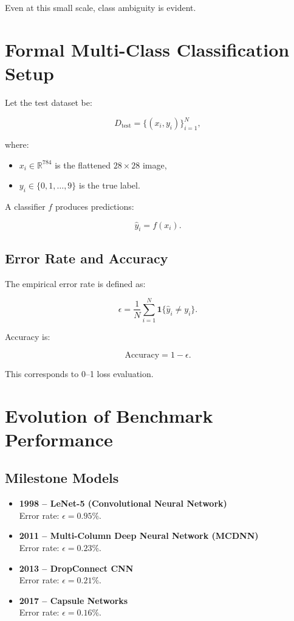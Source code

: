 \documentclass[11pt]{article}
\begin{document}
Even at this small scale, class ambiguity is evident.

\section{Formal Multi-Class Classification Setup}

Let the test dataset be:

\[
D_{\text{test}} = \{(x_i, y_i)\}_{i=1}^N,
\]

where:
\begin{itemize}
    \item $x_i \in \mathbb{R}^{784}$ is the flattened $28\times 28$ image,
    \item $y_i \in \{0,1,\dots,9\}$ is the true label.
\end{itemize}

A classifier $f$ produces predictions:

\[
\hat{y}_i = f(x_i).
\]

\subsection{Error Rate and Accuracy}

The empirical error rate is defined as:

\[
\epsilon =
\frac{1}{N}
\sum_{i=1}^N
\mathbf{1}\{\hat{y}_i \neq y_i\}.
\]

Accuracy is:

\[
\text{Accuracy} = 1 - \epsilon.
\]

This corresponds to 0--1 loss evaluation.

\section{Evolution of Benchmark Performance}

\subsection{Milestone Models}

\begin{itemize}
    \item \textbf{1998 -- LeNet-5 (Convolutional Neural Network)} \\
    Error rate: $\epsilon = 0.95\%$.

    \item \textbf{2011 -- Multi-Column Deep Neural Network (MCDNN)} \\
    Error rate: $\epsilon = 0.23\%$.

    \item \textbf{2013 -- DropConnect CNN} \\
    Error rate: $\epsilon = 0.21\%$.

    \item \textbf{2017 -- Capsule Networks} \\
    Error rate: $\epsilon = 0.16\%$.
\end{itemize}
\end{document}
